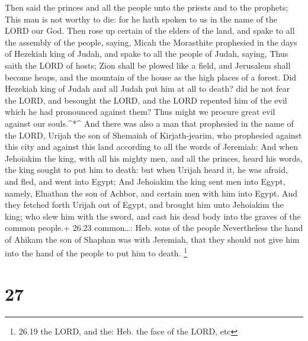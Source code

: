  Then said the princes and all the people unto the priests
and to the prophets; This man is not worthy to die: for he hath spoken
to us in the name of the LORD our God.  Then rose up
certain of the elders of the land, and spake to all the assembly of the
people, saying,  Micah the Morasthite prophesied in the
days of Hezekiah king of Judah, and spake to all the people of Judah,
saying, Thus saith the LORD of hosts; Zion shall be plowed like a field,
and Jerusalem shall become heaps, and the mountain of the house as the
high places of a forest.  Did Hezekiah king of Judah and
all Judah put him at all to death? did he not fear the LORD, and
besought the LORD, and the LORD repented him of the evil which he had
pronounced against them? Thus might we procure great evil against our
souls.\^{}*\^{}  And there was also a man that prophesied
in the name of the LORD, Urijah the son of Shemaiah of Kirjath-jearim,
who prophesied against this city and against this land according to all
the words of Jeremiah:  And when Jehoiakim the king, with
all his mighty men, and all the princes, heard his words, the king
sought to put him to death: but when Urijah heard it, he was afraid, and
fled, and went into Egypt;  And Jehoiakim the king sent men
into Egypt, namely, Elnathan the son of Achbor, and certain men with him
into Egypt.  And they fetched forth Urijah out of Egypt,
and brought him unto Jehoiakim the king; who slew him with the sword,
and cast his dead body into the graves of the common people.+ 26.23
common\ldots: Heb. sons of the people  Nevertheless the
hand of Ahikam the son of Shaphan was with Jeremiah, that they should
not give him into the hand of the people to put him to death.
\footnote{26.19 the LORD, and the: Heb. the face of the LORD, etc}

\hypertarget{section-26}{%
\section{27}\label{section-26}}

